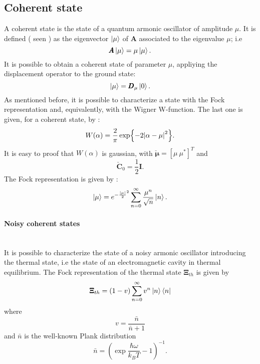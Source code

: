     \subsection{Coherent state}
        A coherent state is the state of a quantum armonic oscillator of amplitude $\mu$.
        It is defined (\cite{tesiGuerrini} seen \cite{CohSt_Glauber,CohSt_Glauber2}) as the eigenvector $\ket{\mu}$ of $\pmb{A}$ 
        associated to the eigenvalue $\mu$; i.e
        \begin{equation}
            \pmb{A}\ket{\mu}=\mu\ket{\mu}.
        \end{equation}
        It is possible to obtain a coherent state of parameter $\mu$, appliying the displacement
        operator to the ground state:
        \begin{equation}
            \ket{\mu}=\pmb{D}_\mu\ket{0}.
        \end{equation}
        As mentioned before, it is possible to characterize a state with the Fock representation
        and, equivalently, with the Wigner W-function. The last one is given, for a coherent state,
        by \cite{QuantumNoise}:
        \begin{equation}
            W(\alpha)=\frac{2}{\pi}\exp{-2\absolutevalue{\alpha-\mu}^2}.
        \end{equation}
        It is easy to proof that $W(\alpha)$ is gaussian, with $\check{\pmb{\mu}}=[\mu\ \mu^*]^T$ and
        \begin{equation*}
            \check{\pmb{C}}_0=\frac{1}{2}\pmb{I}.
        \end{equation*} 
        The Fock representation is given by \cite{Dowling}:
        \begin{equation}
            \ket{\mu}=e^{-\frac{\absolutevalue{\mu}}{2}^2}\sum_{n=0}^{\infty}
            \frac{\mu^n}{\sqrt{n}}\ket{n}.
        \end{equation}

        \paragraph{Noisy coherent states}\mbox{} \\
        \label{par:NoisycohState}
        It is possible to characterize the state of a noisy armonic oscillator introducing
        the thermal state, i.e the state of an electromagnetic cavity in thermal equilibrium.
        The Fock representation of the thermal state $\pmb{\Xi}_{th}$ is given by \cite{tesiGuerrini}
        \begin{equation}
            \pmb{\Xi}_{th}=(1-v)\sum_{n=0}^{\infty}v^n\ket{n}\bra{n}
        \end{equation}
        where
        \begin{equation*}
            v=\frac{\bar{n}}{\bar{n}+1}
        \end{equation*}
        and $\bar{n}$ is the well-known Plank distribution
        \begin{equation*}
            \bar{n}=\left(\exp{\frac{\hbar\omega}{k_B T}}-1\right)^{-1}.
        \end{equation*}

